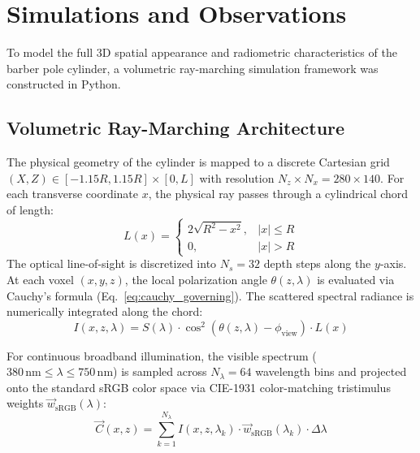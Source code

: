 \documentclass[twocolumn,10pt,a4paper]{article}
\begin{document}
\section{Simulations and Observations}

To model the full 3D spatial appearance and radiometric characteristics of the barber pole cylinder, a volumetric ray-marching simulation framework was constructed in Python.

\subsection{Volumetric Ray-Marching Architecture}
The physical geometry of the cylinder is mapped to a discrete Cartesian grid $(X, Z) \in [-1.15R, 1.15R] \times [0, L]$ with resolution $N_z \times N_x = 280 \times 140$. For each transverse coordinate $x$, the physical ray passes through a cylindrical chord of length:
\begin{equation}
  L(x) = 
  \begin{cases}
    2\sqrt{R^2 - x^2}, & |x| \le R \\
    0, & |x| > R
  \end{cases}
  \label{eq:chord_length}
\end{equation}
The optical line-of-sight is discretized into $N_s = 32$ depth steps along the $y$-axis. At each voxel $(x, y, z)$, the local polarization angle $\theta(z, \lambda)$ is evaluated via Cauchy's formula (Eq.~\ref{eq:cauchy_governing}). The scattered spectral radiance is numerically integrated along the chord:
\begin{equation}
  I(x, z, \lambda) = S(\lambda) \cdot \cos^2\left(\theta(z, \lambda) - \phi_{\text{view}}\right) \cdot L(x)
  \label{eq:voxel_scattering}
\end{equation}

For continuous broadband illumination, the visible spectrum ($380\,\text{nm} \le \lambda \le 750\,\text{nm}$) is sampled across $N_\lambda = 64$ wavelength bins and projected onto the standard sRGB color space via CIE-1931 color-matching tristimulus weights $\vec{w}_{\text{sRGB}}(\lambda)$:
\begin{equation}
  \vec{C}(x, z) = \sum_{k=1}^{N_\lambda} I(x, z, \lambda_k) \cdot \vec{w}_{\text{sRGB}}(\lambda_k) \cdot \Delta\lambda
  \label{eq:color_integration}
\end{equation}
\end{document}
